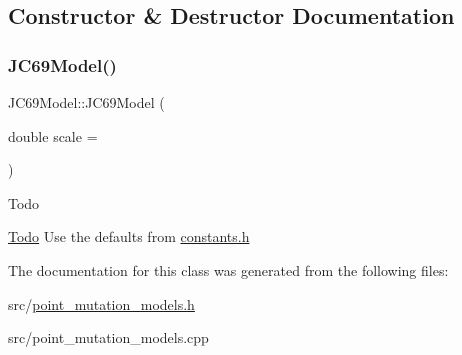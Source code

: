 \subsection{Constructor \& Destructor Documentation}
\mbox{\label{classrcombinator_1_1JC69Model_a979834f85de8b2bb92d0cce5e64d6346}} 
\subsubsection{\texorpdfstring{J\+C69\+Model()}{JC69Model()}}
{\footnotesize\ttfamily J\+C69\+Model\+::\+J\+C69\+Model (\begin{DoxyParamCaption}\item[{double}]{scale = {} }\end{DoxyParamCaption})}

\begin{DoxyRefDesc}{Todo}
\item[\mbox{\hyperlink{todo__todo000007}{Todo}}]Use the defaults from \mbox{\hyperlink{constants_8h}{constants.\+h}} \end{DoxyRefDesc}


The documentation for this class was generated from the following files\+:\begin{DoxyCompactItemize}
\item 
src/\mbox{\hyperlink{point__mutation__models_8h}{point\+\_\+mutation\+\_\+models.\+h}}\item 
src/point\+\_\+mutation\+\_\+models.\+cpp\end{DoxyCompactItemize}

